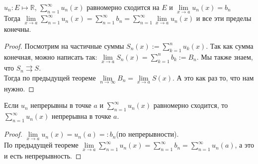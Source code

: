 \begin{theorem} \thmslashn

  $u_n : E \mapsto \mathbb{R}$, $\sum\limits_{n = 1}^{\infty} u_n(x)$ равномерно сходится на $E$ и $\lim\limits_{x\to a} u_n(x) = b_n$\\
  Тогда $\lim\limits_{x\to a} \sum\limits_{n = 1}^{\infty} u_n(x) = \sum\limits_{n = 1}^{\infty} b_n = \sum\limits_{n = 1}^{\infty} \lim\limits_{x\to a} u_n(x)$ и все эти пределы конечны.
\begin{proof} \thmslashn
  
  Посмотрим на частичные суммы $S_n(x) := \sum\limits_{k = 1}^{n} u_k(x)$. Так как сумма конечная, можно написать так: 
  $\lim\limits_{x\to a} S_n(x) = \sum\limits_{k = 1}^{n} b_k := B_n$. Мы также знаем, что $S_n \rightrightarrows S$.\\
  Тогда по предыдущей теореме $\lim\limits_{n\to \infty} B_n = \lim\limits_{x\to a} S(x)$. А это как раз то, что нам нужно.
\end{proof}
\end{theorem}

\begin{consequence} \thmslashn

  Если $u_n$ непрерывны в точке $a$ и $\sum\limits_{n = 1}^{\infty} u_n(x)$ равномерно сходится, то $\sum\limits_{n = 1}^{\infty} u_n(x)$ непрерывна в точке $a$.
\begin{proof} \thmslashn
  
  $\lim\limits_{x\to a} u_n(x) = u_n(a) =: b_n$(по непрерывности).\\ По предыдущей теореме $\lim\limits_{x\to a} \sum\limits_{n = 1}^{\infty} u_n(x) = \sum\limits_{n = 1}^{\infty} b_n = \sum\limits_{n = 1}^{\infty} u_n(a)$, а это и есть непрерывность.
  
\end{proof}
\end{consequence}
